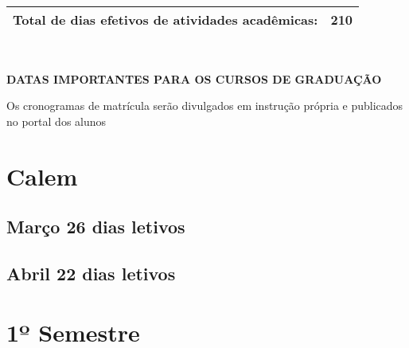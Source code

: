 \documentclass[thesis]{hmcposter}
\begin{document}
\begin{poster}
\begin{center}
\begin{table}
{\begin{tabular}{|c|c|c|c|c|c|c|}
\multicolumn{6}{|c|}{\small \textbf{Total de dias efetivos de atividades acadêmicas:}}              & 210            \\ \hline
\end{tabular}
}
\end{table}
\null
\end{center}
\vfill
\null
\columnbreak
~
\vfill
\begin{center}
\large \textbf{DATAS IMPORTANTES PARA OS CURSOS DE GRADUAÇÃO}
\newline
\null
\newline
\begin{table}
\centering
{}
\end{table}
\newline
\null
\newline
Os cronogramas de matrícula serão divulgados em instrução própria e publicados no portal dos alunos
\end{center}
\vfill
\null
\newpage\section{\color{hmcorange}Calem}\subsection{Março \hfill 26 dias letivos}\subsection{Abril \hfill 22 dias letivos}\vfill\null
\columnbreak
\section{\hfill \color{hmcorange}1º Semestre}

\end{poster}
\end{document}
